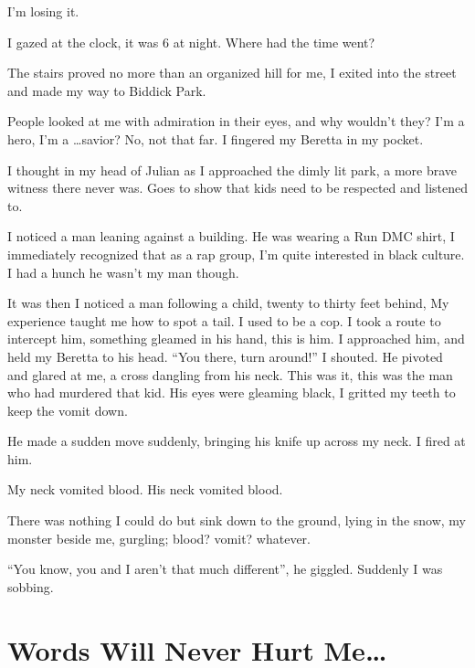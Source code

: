 I'm losing it.



I gazed at the clock, it was 6 at night. Where had the time
went?



The stairs proved no more than an organized hill for me, I exited
into the street and made my way to Biddick Park.



People looked at me with admiration in their eyes, and why wouldn't
they? I'm a hero, I'm a {\ldots}savior? No, not that far. I fingered my
Beretta in my pocket.



I thought in my head of Julian as I approached the dimly lit park,
a more brave witness there never was. Goes to show that kids need
to be respected and listened to.



I noticed a man leaning against a building. He was wearing a Run
DMC shirt, I immediately recognized that as a rap group, I'm quite
interested in black culture. I had a hunch he wasn't my man
though.



It was then I noticed a man following a child, twenty to thirty
feet behind, My experience taught me how to spot a tail. I used to
be a cop. I took a route to intercept him, something gleamed in his
hand, this is him. I approached him, and held my Beretta to his
head. ``You there, turn around!'' I shouted. He pivoted and glared at
me, a cross dangling from his neck. This was it, this was the man
who had murdered that kid. His eyes were gleaming black, I gritted
my teeth to keep the vomit down.



He made a sudden move suddenly, bringing his knife up across my
neck. I fired at him.



My neck vomited blood. His neck vomited blood.



There was nothing I could do but sink down to the ground, lying in
the snow, my monster beside me, gurgling; blood? vomit?
whatever.



``You know, you and I aren't that much different'', he giggled.
Suddenly I was sobbing. 
 



\chapter{Words Will Never Hurt Me{\ldots}}





